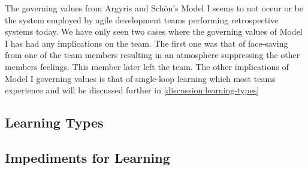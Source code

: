 The governing values from Argyris and Schön's Model I seems to not occur or be the system employed by agile development teams performing retrospective systems today. We have only seen two cases where the governing values of Model I has had any implications on the team. The first one was that of face-saving from one of the team members resulting in an atmosphere suppressing the other members feelings. This member later left the team. The other implications of Model I governing values is that of single-loop learning which most teams experience and will be discussed further in \autoref{discussion:learning-types}

\subsection{Learning Types}
\label{discussion:learning-types}
\subsection{Impediments for Learning}
